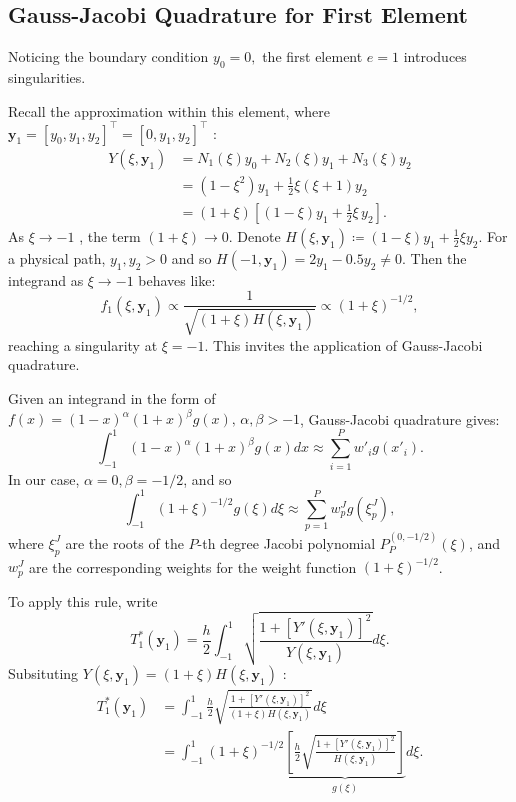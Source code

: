 \documentclass[11pt]{article}
\begin{document}
\subsection{Gauss-Jacobi Quadrature for First Element}

Noticing the boundary condition \( y_{0} = 0, \) the first element \( e=1 \) introduces singularities. 

Recall the approximation within this element, where \( \mathbf{y}_1 = [y_0, y_1, y_2]^\top = [0, y_1, y_2]^\top \) :
\begin{align*}
    Y(\xi, \mathbf{y}_1) &= N_1(\xi)y_0 + N_2(\xi)y_1 + N_3(\xi)y_2 \\
    &= (1 - \xi^2)y_1 + \frac{1}{2}\xi(\xi+1)y_2 \\
    &= (1 + \xi)\left[(1-\xi) y_{1} + \frac{1}{2} \xi \, y_{2}\right].
\end{align*}
As \( \xi \to -1 \) , the term \( (1+\xi) \to 0 \). Denote \( H(\xi, \mathbf{y}_1) \coloneqq (1-\xi)y_1 + \frac{1}{2}\xi y_2 \). For a physical path, \( y_{1}, y_{2} > 0 \) and so \( H(-1, \mathbf{y}_1) = 2y_1 - 0.5y_2 \neq 0 \). 
Then the integrand as \( \xi \to -1 \) behaves like: 
\[ 
    f_1(\xi, \mathbf{y}_1) \propto \frac{1}{\sqrt{(1+\xi) H(\xi, \mathbf{y}_1)}} \propto (1+\xi)^{-1/2},
\]
reaching a singularity at \( \xi = -1 \). This invites the application of Gauss-Jacobi quadrature. 

Given an integrand in the form of \( f(x) = (1-x)^{\alpha} (1+x)^{\beta}  g(x), \, \alpha, \beta > -1  \), Gauss-Jacobi quadrature gives:  
\[ 
    \int_{-1}^{1} (1-x)^{\alpha} (1+x)^{\beta} g(x) dx \approx \sum_{i=1}^{P} w'_{i} g(x'_{i}).
\]
In our case,  \(\alpha=0, \beta=-1/2\), and so 
\[ 
    \int_{-1}^{1} (1+\xi)^{-1/2} g(\xi) d\xi \approx \sum_{p=1}^{P} w_{p}^{J} g(\xi_{p}^{J}) ,
\]
where \( \xi_{p}^{J} \) are the roots of the \( P\)-th degree Jacobi polynomial \( P_P^{(0, -1/2)}(\xi) \), and \( w_{p}^{J} \) are the corresponding weights for the weight function \( (1+\xi)^{-1/2} \).

To apply this rule, write 
\[ 
    T_1^*(\mathbf{y}_1) = \frac{h}{2} \int_{-1}^{1} \sqrt{\frac{1 + [Y'(\xi, \mathbf{y}_1)]^2}{Y(\xi, \mathbf{y}_1)}}  d\xi.
\]
Subsituting \( Y(\xi, \mathbf{y}_1) = (1+\xi) H(\xi, \mathbf{y}_1) \) : 
\begin{align*}
    T_1^*(\mathbf{y}_1) &= \int_{-1}^{1}  \frac{h}{2} \sqrt{\frac{1 + [Y'(\xi, \mathbf{y}_1)]^2}{(1+\xi) H(\xi, \mathbf{y}_1)}} d\xi \\
    &= \int_{-1}^{1} (1+\xi)^{-1/2}  \underbrace{\left[\frac{h}{2}  \sqrt{\frac{1 + [Y'(\xi, \mathbf{y}_1)]^2}{H(\xi, \mathbf{y}_1)}} \right]}_{g(\xi)} d\xi.
\end{align*}
\end{document}
